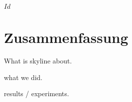 
\svnInfo $Id$


\chapter*{Zusammenfassung\revision}

What is skyline about.

what we did.

results / experiments.

